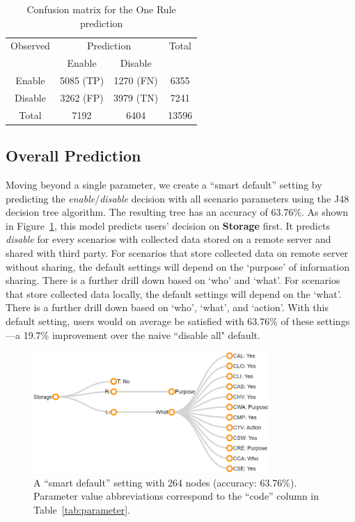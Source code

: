 \begin{table}
	\centering
	\caption{Confusion matrix for the One Rule prediction}
	\label{tab:oner_confusion_matrix}
	\begin{tabular}{c|c|c|c} \hline
		Observed &\multicolumn{2}{c|}{Prediction} & Total\\ \cline{2-3}
		& Enable     & Disable       &  \\ \hline
		Enable   & 5085 (TP) & 1270 (FN)  & 6355   \\ \hline
		Disable    & 3262 (FP)  & 3979 (TN) & 7241  \\ \hline
		Total & 7192     & 6404     & 13596  \\ \hline
	\end{tabular}
\end{table}

\subsection{Overall Prediction}
Moving beyond a single parameter, we create a ``smart default'' setting by predicting the \textit{enable}/\textit{disable} decision with all scenario parameters using the J48 decision tree algorithm.
The resulting tree has an accuracy of 63.76\%. As shown in Figure~\ref{fig:smart_default}, this model predicts users' decision on \textbf{Storage} first. It predicts \textit{disable} for every scenarios with collected data stored on a remote server and shared with third party. For scenarios that store collected data on remote server without sharing, the default settings will depend on the `purpose' of information sharing. There is a further drill down based on `who' and `what'. For scenarios that store collected data locally, the default settings will depend on the `what'. There is a further drill down based on `who', `what', and `action'. With this default setting, users would on average be satisfied with 63.76\% of these settings---a 19.7\% improvement over the naive ``disable all" default. 

\begin{figure}
	\centering
	\includegraphics[width=0.8\textwidth]{figures/smartdefault025.png}
	\caption{A ``smart default'' setting with 264 nodes (accuracy: 63.76\%). Parameter value abbreviations correspond to the ``code'' column in Table~\ref{tab:parameter}.}
	\label{fig:smart_default}
\end{figure}

